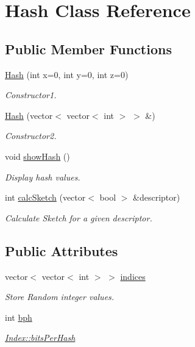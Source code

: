 \hypertarget{classHash}{\section{\-Hash \-Class \-Reference}
\label{classHash}
}
\subsection*{\-Public \-Member \-Functions}
\begin{DoxyCompactItemize}
\item 
\hyperlink{classHash_a0d9900832f48b313f39a85866ca97e30}{\-Hash} (int x=0, int y=0, int z=0)
\begin{DoxyCompactList}\small\item\em \-Constructor1. \end{DoxyCompactList}\item 
\hyperlink{classHash_ac26af76f12633c324c56b82493bce9ef}{\-Hash} (vector$<$ vector$<$ int $>$ $>$ \&)
\begin{DoxyCompactList}\small\item\em \-Constructor2. \end{DoxyCompactList}\item 
\hypertarget{classHash_ab426e18bbe0c541990e504b1267336fe}{void \hyperlink{classHash_ab426e18bbe0c541990e504b1267336fe}{show\-Hash} ()}\label{classHash_ab426e18bbe0c541990e504b1267336fe}

\begin{DoxyCompactList}\small\item\em \-Display hash values. \end{DoxyCompactList}\item 
int \hyperlink{classHash_af1d709ab09752d4324224a4590e2d5f3}{calc\-Sketch} (vector$<$ bool $>$ \&descriptor)
\begin{DoxyCompactList}\small\item\em \-Calculate \-Sketch for a given descriptor. \end{DoxyCompactList}\end{DoxyCompactItemize}
\subsection*{\-Public \-Attributes}
\begin{DoxyCompactItemize}
\item 
vector$<$ vector$<$ int $>$ $>$ \hyperlink{classHash_a312855c01b7618ea56601216467354ee}{indices}
\begin{DoxyCompactList}\small\item\em \-Store \-Random integer values. \end{DoxyCompactList}\item 
\hypertarget{classHash_a9cf27a69da7d25a853b9b223fc189de8}{int \hyperlink{classHash_a9cf27a69da7d25a853b9b223fc189de8}{bph}}\label{classHash_a9cf27a69da7d25a853b9b223fc189de8}

\begin{DoxyCompactList}\small\item\em \hyperlink{classIndex_a32015f3d373d5ad89ec2422e6d170f26}{\-Index\-::bits\-Per\-Hash} \end{DoxyCompactList}\end{DoxyCompactItemize}


